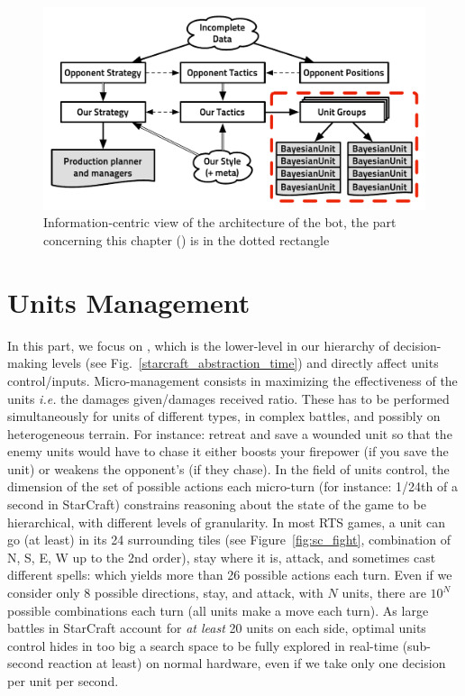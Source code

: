 
\begin{figure}[!ht]
\begin{center}
\includegraphics[width=13cm]{images/starcraft_bbq_concept_MICRO.pdf}
\end{center}
\caption{Information-centric view of the architecture of the bot, the part concerning this chapter () is in the dotted rectangle}
\label{fig:conceptMICRO}
\end{figure}

\section{Units Management}
In this part, we focus on , which is the lower-level in our hierarchy of decision-making levels (see Fig.~\ref{starcraft_abstraction_time}) and directly affect units control/inputs. Micro-management consists in maximizing the effectiveness of the units \textit{i.e.} the damages given/damages received ratio. These has to be performed simultaneously for units of different types, in complex battles, and possibly on heterogeneous terrain. 
For instance: retreat and save a wounded unit so that the enemy units would have to chase it either boosts your firepower (if you save the unit) or weakens the opponent's (if they chase). 
In the field of units control, the dimension of the set of possible actions each micro-turn (for instance: 1/24th of a second in StarCraft) constrains reasoning about the state of the game to be hierarchical, with different levels of granularity. In most RTS games, a unit can go (at least) in its 24 surrounding tiles (see Figure~\ref{fig:sc_fight}, combination of N, S, E, W up to the 2nd order), 
stay where it is, attack, and sometimes cast different spells: which yields more than 26 possible actions each turn. Even if we consider only 8 possible directions, stay, and attack, with $N$ units, there are $10^N$ possible combinations each turn (all units make a move each turn). As large battles in StarCraft account for \textit{at least} 20 units on each side, optimal units control hides in too big a search space to be fully explored in real-time (sub-second reaction at least) on normal hardware, even if we take only one decision per unit per second.

